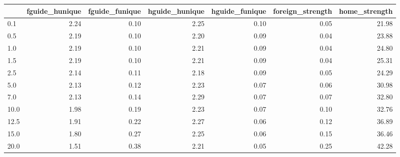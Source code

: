 \begin{tabular}{lrrrrrr}
\toprule
 & fguide_hunique & fguide_funique & hguide_hunique & hguide_funique & foreign_strength & home_strength \\
\midrule
0.1 & 2.24 & 0.10 & 2.25 & 0.10 & 0.05 & 21.98 \\
0.5 & 2.19 & 0.10 & 2.20 & 0.09 & 0.04 & 23.88 \\
1.0 & 2.19 & 0.10 & 2.21 & 0.09 & 0.04 & 24.80 \\
1.5 & 2.19 & 0.10 & 2.21 & 0.09 & 0.04 & 25.31 \\
2.5 & 2.14 & 0.11 & 2.18 & 0.09 & 0.05 & 24.29 \\
5.0 & 2.13 & 0.12 & 2.23 & 0.07 & 0.06 & 30.98 \\
7.0 & 2.13 & 0.14 & 2.29 & 0.07 & 0.07 & 32.80 \\
10.0 & 1.98 & 0.19 & 2.23 & 0.07 & 0.10 & 32.76 \\
12.5 & 1.91 & 0.22 & 2.27 & 0.06 & 0.12 & 36.89 \\
15.0 & 1.80 & 0.27 & 2.25 & 0.06 & 0.15 & 36.46 \\
20.0 & 1.51 & 0.38 & 2.21 & 0.05 & 0.25 & 42.28 \\
\bottomrule
\end{tabular}
